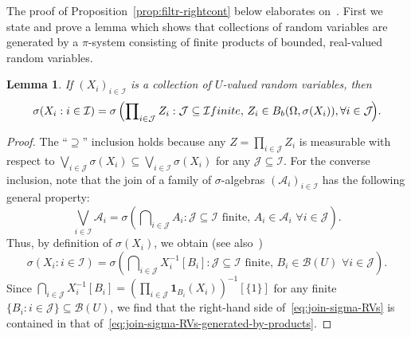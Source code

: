 \documentclass[reqno]{amsart}
\numberwithin{equation}{section}
\newcommand{\cA}{\mathcal{A}}
\newcommand{\cB}{\mathcal{B}}
\newcommand{\cI}{\mathcal{I}}
\newcommand{\cJ}{\mathcal{J}}
\newtheorem{lemma}{Lemma}[section]
\theoremstyle{remark}
\theoremstyle{definition}
\begin{document}
The proof of Proposition~\ref{prop:filtr-rightcont} below elaborates on~\cite[Example~3.6]{BOGP2010}.
First we state and prove a lemma which shows that collections of random variables
are generated by a $\pi$-system consisting of finite products of bounded, real-valued random variables.
%
\begin{lemma}\label{lem:sigma-algebra-collection-RVs}
	If $(X_i)_{i\in\cI}$ is a collection of $U$-valued random variables, then
	\begin{equation}\label{eq:join-sigma-RVs-generated-by-products}
		\sigma(X_i : i \in \cI)
		=
		\sigma\left( \prod\nolimits_{i \in \cJ} Z_i : \cJ \subseteq \cI \textup{ finite}, \, Z_i \in B_b(\Omega, \sigma(X_i)),
		\forall i \in \cJ\!\right)\!.
	\end{equation}
\end{lemma}
\begin{proof}
	The ``$\supseteq$'' inclusion holds because any $Z = \prod_{i\in \cJ} Z_i$ is
	measurable with respect to $\bigvee_{i\in \cJ}  \sigma(X_i) \subseteq \bigvee_{i\in\cI} \sigma(X_i)$
	for any $\cJ \subseteq \cI$.
	For the converse inclusion, note that the join of a family of $\sigma$-algebras $(\cA_i)_{i\in\cI}$
	has the following general property:
	\[
	\bigvee_{i \in \cI} \cA_i 
	=
	\sigma\left( \bigcap\nolimits_{i\in \cJ} A_i : \cJ \subseteq \cI \text{ finite}, \, A_i \in \cA_i \,\,
	\forall i \in \cJ\right)\!.
	\]
	Thus, by definition of $\sigma(X_i)$, we obtain (see also~\cite[Chapter~0, Theorem~2.3]{RevuzYor1999})
	\begin{equation}\label{eq:join-sigma-RVs}
		\sigma(X_i : i \in \cI)
		=
		\sigma\left(\bigcap\nolimits_{i \in \cJ} X_i^{-1}[B_i] : \cJ \subseteq \cI \text{ finite}, \, B_i \in \cB(U) \,\,
		\forall i \in \cJ\right)\!.
	\end{equation}
	Since $\bigcap_{i\in \cJ} X_i^{-1}[B_i] = (\prod_{i\in \cJ} \mathbf 1_{B_i}(X_i))^{-1}[\{1\}]$
	for any finite $\{B_i : i \in \cJ\} \subseteq \cB(U)$,
	we find that the right-hand side of~\eqref{eq:join-sigma-RVs} is contained
	in that of~\eqref{eq:join-sigma-RVs-generated-by-products}.
\end{proof}
\end{document}

